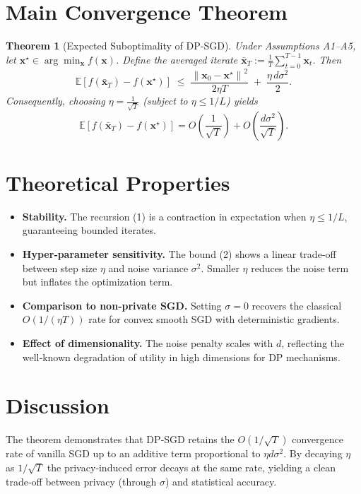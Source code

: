 \documentclass{article}
\newtheorem{theorem}{Theorem}
\newcommand{\E}{\mathbb{E}}
\newcommand{\norm}[1]{\left\|#1\right\|}
\begin{document}
\section*{Main Convergence Theorem}
\begin{theorem}[Expected Suboptimality of DP‑SGD]\label{thm:main}
Under Assumptions A1–A5, let $\bm{x}^{\star}\in\arg\min_{\bm{x}}f(\bm{x})$.
Define the averaged iterate $\bar{\bm{x}}_T:=\frac{1}{T}\sum_{t=0}^{T-1}\bm{x}_t$.
Then
\[
\E\!\left[f(\bar{\bm{x}}_T)-f(\bm{x}^{\star})\right]
\;\le\;
\frac{\norm{\bm{x}_0-\bm{x}^{\star}}^{2}}{2\eta T}
\;+\;
\frac{\eta\,d\sigma^{2}}{2}.
\tag{2}
\]
Consequently, choosing $\eta=\frac{1}{\sqrt{T}}$ (subject to $\eta\le 1/L$) yields
\[
\E\!\left[f(\bar{\bm{x}}_T)-f(\bm{x}^{\star})\right]
=O\!\left(\frac{1}{\sqrt{T}}\right)+O\!\left(\frac{d\sigma^{2}}{\sqrt{T}}\right).
\tag{3}
\]
\end{theorem}

\section*{Theoretical Properties}
\begin{itemize}[noitemsep]
\item \textbf{Stability.} The recursion (1) is a contraction in expectation when $\eta\le 1/L$, guaranteeing bounded iterates.
\item \textbf{Hyper‑parameter sensitivity.} The bound (2) shows a linear trade‑off between step size $\eta$ and noise variance $\sigma^{2}$. Smaller $\eta$ reduces the noise term but inflates the optimization term.
\item \textbf{Comparison to non‑private SGD.} Setting $\sigma=0$ recovers the classical $O(1/(\eta T))$ rate for convex smooth SGD with deterministic gradients.
\item \textbf{Effect of dimensionality.} The noise penalty scales with $d$, reflecting the well‑known degradation of utility in high dimensions for DP mechanisms.
\end{itemize}

\section*{Discussion}
The theorem demonstrates that DP‑SGD retains the $O(1/\sqrt{T})$ convergence rate of vanilla SGD up to an additive term proportional to $\eta d\sigma^{2}$. By decaying $\eta$ as $1/\sqrt{T}$ the privacy‑induced error decays at the same rate, yielding a clean trade‑off between privacy (through $\sigma$) and statistical accuracy.
\end{document}
